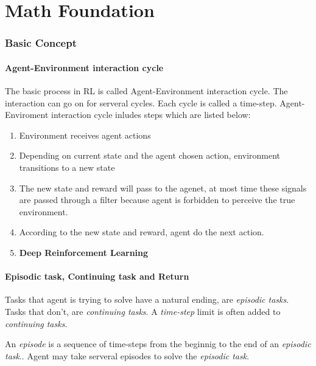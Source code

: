 \part{Math Foundation}

\section{Basic Concept}

  \subsection{Agent-Environment interaction cycle}

    The basic process in RL is called Agent-Environment interaction cycle. The interaction can go on for serveral cycles.
    Each cycle is called a time-step. Agent-Enviroment interaction cycle inludes steps which are listed below:
    \begin{enumerate}
      \item
            Environment receives agent actions
      \item
            Depending on current state and the agent chosen action, environment transitions to a new state
      \item
            The new state and reward will pass to the agenet, at most time these signals are passed through a filter because agent
            is forbidden to perceive the true environment.
      \item
            According to the new state and reward, agent do the next action. 
      \item
            {\bfseries \textcolor{myblue}{Deep Reinforcement Learning}}
    \end{enumerate}

  \subsection{Episodic task, Continuing task and Return}

    \label{sec:episode}
    Tasks that agent is trying to solve have a natural ending, are {\itshape episodic tasks}. Tasks that don't, are
      {\itshape continuing tasks}. A {\itshape time-step} limit is often added to {\itshape continuing tasks}. \par

    An \emph{episode} is a sequence of time-steps from the beginnig to the end of an \emph{episodic task}.. Agent may take serveral episodes to solve the {\itshape episodic task}.
     \par


